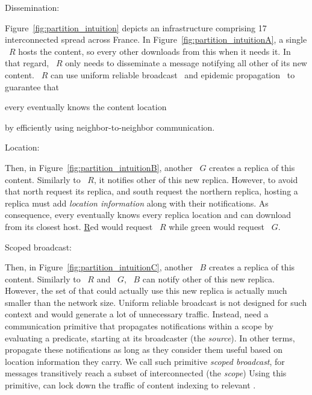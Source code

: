\begin{asparadesc}
\item [Dissemination:]

Figure~\ref{fig:partition_intuition} depicts an infrastructure
comprising 17 interconnected \processes spread across France. In
Figure~\ref{fig:partition_intuitionA}, a single \Process~$R$ hosts the
content, so every other \process downloads from this \process when it
needs it. In that regard, \Process~$R$ only needs to disseminate a
message notifying all other \processes of its new content. \Process~$R$
can use uniform reliable broadcast~\cite{hadzilacos1994modular} and epidemic propagation~\cite{epidemic-protocol}
to guarantee that
\begin{inparaenum}[(i)]
\item every \process eventually knows the content location
\item by efficiently using neighbor-to-neighbor communication.
\end{inparaenum}

\item [Location:]

Then, in Figure~\ref{fig:partition_intuitionB}, another \Process~$G$
creates a replica of this content. Similarly to \Process~$R$, it
notifies other \processes of this new replica. However, to avoid that
north \processes request its replica, and south \processes request the
northern replica, \processes hosting a replica must add \emph{location
information} along with their notifications. As consequence, every
\process eventually knows every replica location and can download from
its closest host. \underline{R}ed \processes would request
\Process~$R$ while \underline{g}reen \processes would request
\Process~$G$.

\item [Scoped broadcast:]

Then, in Figure~\ref{fig:partition_intuitionC}, another \Process~$B$
creates a replica of this content. Similarly to \Process~$R$ and
\Process~$G$, \Process~$B$ can notify other \processes of this new
replica. However, the set of \processes that could actually use this
new replica is actually much smaller than the network size. Uniform
reliable broadcast is not designed for such context and would generate
a lot of unnecessary traffic. Instead, \processes need a communication
primitive that propagates notifications within a scope by evaluating a
predicate, starting at its broadcaster (the \emph{source}).
In other terms, \processes propagate these notifications as long as they
consider them useful based on location information they carry. We call
such primitive \emph{scoped broadcast}, for messages transitively
reach a subset of interconnected \processes (the \emph{scope})
Using this primitive, \processes can lock down the traffic of content
indexing to relevant \processes.


\end{asparadesc}
